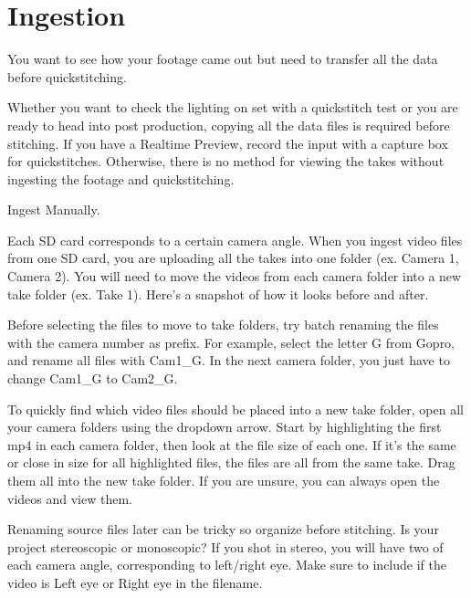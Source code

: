 \chapter{Ingestion}
\pagecolor{white}
\label{chap:??}
\begin{fullwidth}

\problem

{\large You want to see how your footage came out but need to transfer all the data before quickstitching. \par}

Whether you want to check the lighting on set with a quickstitch test or you are ready to head into post production, copying all the data files is required before stitching. If you have a Realtime Preview, record the input with a capture box for quickstitches. Otherwise, there is no method for viewing the takes without ingesting the footage and quickstitching. 

\solution

{\large Ingest Manually. \par}

Each SD card corresponds to a certain camera angle. When you ingest video files from one SD card, you are uploading all the takes into one folder (ex. Camera 1, Camera 2). You will need to move the videos from each camera folder into a new take folder (ex. Take 1). Here's a snapshot of how it looks before and after.


\tip Before selecting the files to move to take folders, try batch renaming the files with the camera number as prefix. For example, select the letter G from Gopro, and rename all files with Cam1\_G. In the next camera folder, you just have to change Cam1\_G to Cam2\_G.

To quickly find which video files should be placed into a new take folder, open all your camera folders using the dropdown arrow. Start by highlighting the first mp4 in each camera folder, then look at the file size of each one. If it's the same or close in size for all highlighted files, the files are all from the same take. Drag them all into the new take folder. If you are unsure, you can always open the videos and view them.

Renaming source files later can be tricky so organize before stitching. Is your project stereoscopic or monoscopic? If you shot in stereo, you will have two of each camera angle, corresponding to left/right eye. Make sure to include if the video is Left eye or Right eye in the filename.


\end{fullwidth}
